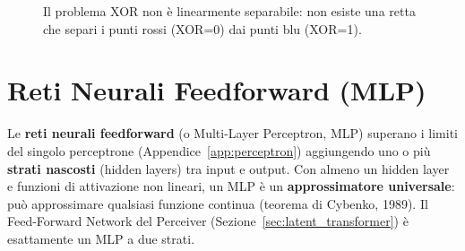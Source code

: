 \documentclass[12pt,a4paper]{article}
\begin{document}
\begin{figure}[H]
\centering
{}
\caption{Il problema XOR non \`e linearmente separabile: non esiste una retta che separi i punti rossi (XOR=0) dai punti blu (XOR=1).}
\label{fig:xor}
\end{figure}



\newpage
\section{Reti Neurali Feedforward (MLP)} \label{app:feedforward}

Le \textbf{reti neurali feedforward} (o Multi-Layer Perceptron, MLP) superano i limiti del singolo perceptrone (Appendice~\ref{app:perceptron}) aggiungendo uno o pi\`u \textbf{strati nascosti} (hidden layers) tra input e output. Con almeno un hidden layer e funzioni di attivazione non lineari, un MLP \`e un \textbf{approssimatore universale}: pu\`o approssimare qualsiasi funzione continua (teorema di Cybenko, 1989). Il Feed-Forward Network del Perceiver (Sezione~\ref{sec:latent_transformer}) \`e esattamente un MLP a due strati.
\end{document}
